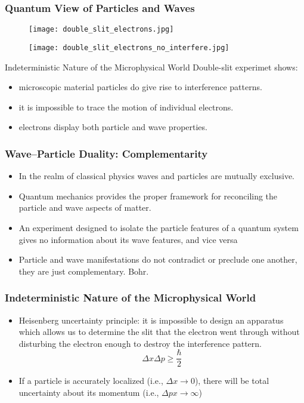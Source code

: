 \documentclass[10pt]{beamer}
\begin{document}
\begin{frame}
\frametitle{Quantum View of Particles and Waves}
\begin{figure}
\texttt{[image: double\_slit\_electrons.jpg]}
\end{figure}
\begin{figure}
\pause \texttt{[image: double\_slit\_electrons\_no\_interfere.jpg]}
\end{figure}
\end{frame}

\begin{frame}{Indeterministic Nature of the Microphysical World}
Double-slit experimet shows:
\begin{itemize}
\item microscopic material particles do give rise to interference patterns.
\item it is impossible to trace the motion of individual electrons.
\item electrons display both particle and wave properties.
\end{itemize}
\end{frame}

\begin{frame}
\frametitle{Wave–Particle Duality: Complementarity}
\begin{itemize} 
\item In the realm of classical physics waves and particles are mutually exclusive.
\pause \item Quantum mechanics provides the proper framework for reconciling the particle and wave aspects of matter.
\pause \item An experiment designed to isolate the particle features of a quantum system gives no information about its wave features, and vice versa
\pause \item Particle and wave manifestations do not contradict or preclude one another, they are just \alert{complementary}. Bohr.
\end{itemize}
\end{frame}

\begin{frame}
\frametitle{Indeterministic Nature of the Microphysical World}
\begin{itemize}
\item \alert{Heisenberg uncertainty principle:} \pause it is impossible to design an apparatus which allows us to determine the slit that the electron went through without disturbing the electron enough to destroy the interference pattern.
\pause $$\Delta x \Delta p \geq \frac{\hbar}{2}$$
\item \pause If a particle is accurately localized (i.e., $\Delta x \rightarrow 0$), there will be total uncertainty about its momentum (i.e., $\Delta px \rightarrow \infty$)
\end{itemize}
\end{frame}
\end{document}
